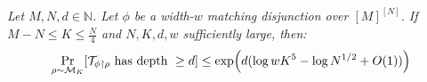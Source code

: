 \documentclass[11pt]{article}
\newtheorem{lemma}{Lemma}
\newtheorem*{lemma*}{Lemma}
\newtheorem{definition}{Definition}
\newcommand{\todo}[1]{\textcolor{red}{TODO: #1}}
\begin{document}
{\it Let $M,N,d \in \mathbb{N}$. 
Let $\phi$ be a width-$w$ matching disjunction over $[M]^{[N]}$. 
If $M-N \leq K \leq \frac{N}{4}$ and $N,K,d,w$ sufficiently large, then:
\[
\Pr_{\rho \sim \mathcal{M}_K} [\mathcal{T}_{\phi\upharpoonright \rho} \text{ has depth } \geq d] \leq \exp\Bigl(d (\log wK^5 -\log N^{1/2} + O(1))\Bigr)
\]
}
\end{document}
